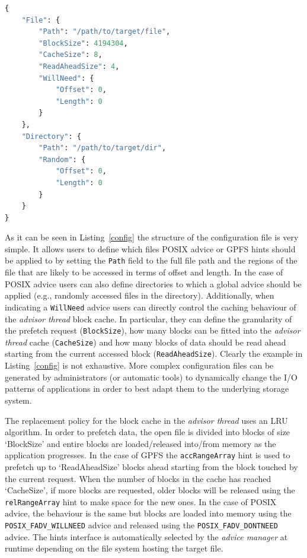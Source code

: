 \begin{lstlisting}[language=python, caption=Example of Json Configuration File, label={config}]
{
    "File": {
        "Path": "/path/to/target/file",
        "BlockSize": 4194304,
        "CacheSize": 8,
        "ReadAheadSize": 4,
        "WillNeed": {
            "Offset": 0,
            "Length": 0
        }
    },
    "Directory": {
        "Path": "/path/to/target/dir",
        "Random": {
            "Offset": 0,
            "Length": 0
        }
    }
}
\end{lstlisting}

As it can be seen in Listing~\ref{config} the structure of the configuration file is very simple. It allows users to define which files POSIX advice or GPFS hints should be applied to by setting the \texttt{Path} field to the full file path and the regions of 
the file that are likely to be accessed in terms of offset and length. In the case of POSIX advice users can also define directories to which a global advice should be applied (e.g., randomly accessed files in the directory). Additionally, when indicating 
a \texttt{WillNeed} advice users can directly control the caching behaviour of the \textit{advisor thread} block cache. In particular, they can define the granularity of the prefetch request (\texttt{BlockSize}), how many blocks can be fitted into the \textit{advisor thread} 
cache (\texttt{CacheSize}) and how many blocks of data should be read ahead starting from the current accessed block (\texttt{ReadAheadSize}). Clearly the example in Listing~\ref{config} is not exhaustive. More complex configuration files can be generated by administrators 
(or automatic tools) to dynamically change the I/O patterns of applications in order to best adapt them to the underlying storage system.

The replacement policy for the block cache in the \textit{advisor thread} uses an LRU algorithm. In order to prefetch data, the open file is divided into blocks of size `BlockSize' and entire blocks are loaded/released into/from memory as the application 
progresses. In the case of GPFS the \texttt{accRangeArray} hint is used to prefetch up to `ReadAheadSize' blocks ahead starting from the block touched by the current request. When the number of blocks in the cache has reached `CacheSize', if more blocks are 
requested, older blocks will be released using the \texttt{relRangeArray} hint to make space for the new ones. In the case of POSIX advice, the behaviour is the same but blocks are loaded into memory using the \texttt{POSIX\_FADV\_WILLNEED} advice and released 
using the \texttt{POSIX\_FADV\_DONTNEED} advice. The hints interface is automatically selected by the \textit{advice manager} at runtime depending on the file system hosting the target file. 

